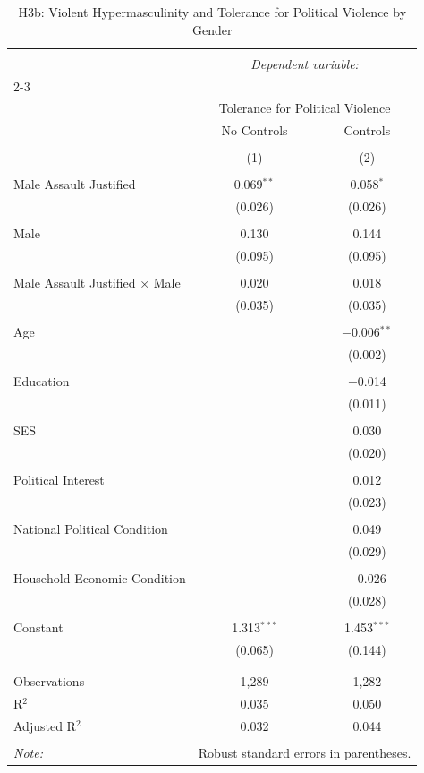 
\begin{table}[!htbp] \centering 
  \caption{H3b: Violent Hypermasculinity and Tolerance for Political Violence by Gender} 
  \label{tab:h3b} 
\begin{tabular}{@{\extracolsep{5pt}}lcc} 
\\[-1.8ex]\hline 
\hline \\[-1.8ex] 
 & \multicolumn{2}{c}{\textit{Dependent variable:}} \\ 
\cline{2-3} 
\\[-1.8ex] & \multicolumn{2}{c}{Tolerance for Political Violence} \\ 
 & No Controls & Controls \\ 
\\[-1.8ex] & (1) & (2)\\ 
\hline \\[-1.8ex] 
 Male Assault Justified & 0.069$^{**}$ & 0.058$^{*}$ \\ 
  & (0.026) & (0.026) \\ 
  & & \\ 
 Male & 0.130 & 0.144 \\ 
  & (0.095) & (0.095) \\ 
  & & \\ 
 Male Assault Justified × Male & 0.020 & 0.018 \\ 
  & (0.035) & (0.035) \\ 
  & & \\ 
 Age &  & $-$0.006$^{**}$ \\ 
  &  & (0.002) \\ 
  & & \\ 
 Education &  & $-$0.014 \\ 
  &  & (0.011) \\ 
  & & \\ 
 SES &  & 0.030 \\ 
  &  & (0.020) \\ 
  & & \\ 
 Political Interest &  & 0.012 \\ 
  &  & (0.023) \\ 
  & & \\ 
 National Political Condition &  & 0.049 \\ 
  &  & (0.029) \\ 
  & & \\ 
 Household Economic Condition &  & $-$0.026 \\ 
  &  & (0.028) \\ 
  & & \\ 
 Constant & 1.313$^{***}$ & 1.453$^{***}$ \\ 
  & (0.065) & (0.144) \\ 
  & & \\ 
\hline \\[-1.8ex] 
Observations & 1,289 & 1,282 \\ 
R$^{2}$ & 0.035 & 0.050 \\ 
Adjusted R$^{2}$ & 0.032 & 0.044 \\ 
\hline 
\hline \\[-1.8ex] 
\textit{Note:}  & \multicolumn{2}{r}{Robust standard errors in parentheses.} \\ 
\end{tabular} 
\end{table} 
